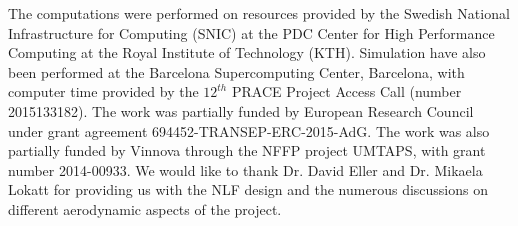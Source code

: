 The computations were performed on resources provided by the Swedish National Infrastructure for Computing (SNIC) at the PDC Center for High Performance Computing at the Royal Institute of Technology (KTH). Simulation have also been performed at the Barcelona Supercomputing Center, Barcelona, with computer time provided by the $12^{th}$ PRACE Project Access Call (number 2015133182). The work was partially funded by European Research Council under grant agreement 694452-TRANSEP-ERC-2015-AdG. The work was also partially funded by Vinnova through the NFFP project UMTAPS, with grant number 2014-00933. We would like to thank Dr. David Eller and Dr. Mikaela Lokatt for providing us with the NLF design and the numerous discussions on different aerodynamic aspects of the project.



%
%



%
